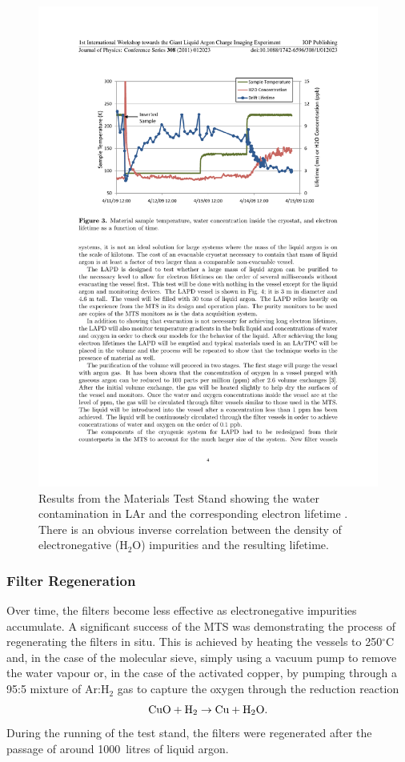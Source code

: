 \begin{figure}
  \centering
  \includegraphics[width=12cm]{MTSResults.pdf}
  \caption[Results from the Materials Test Stand showing the water contamination in LAr and the corresponding electron lifetime.]{Results from the Materials Test Stand showing the water contamination in LAr and the corresponding electron lifetime \cite{MTS2009a}.  There is an obvious inverse correlation between the density of electronegative (H$_2$O) impurities and the resulting lifetime.}
  \label{fig:MTSResults}
\end{figure}

\subsubsection{Filter Regeneration}\label{sec:FilterRegeneration}

Over time, the filters become less effective as electronegative impurities accumulate.  A significant success of the MTS was demonstrating the process of regenerating the filters in situ.  This is achieved by heating the vessels to 250$^{\circ}$C and, in the case of the molecular sieve, simply using a vacuum pump to remove the water vapour or, in the case of the activated copper, by pumping through a 95:5 mixture of Ar:H$_2$ gas to capture the oxygen through the reduction reaction
\begin{equation}
  \textnormal{CuO} + \textnormal{H}_2 \rightarrow \textnormal{Cu} + \textnormal{H}_2\textnormal{O}.
\end{equation}
During the running of the test stand, the filters were regenerated after the passage of around 1000~litres of liquid argon.

